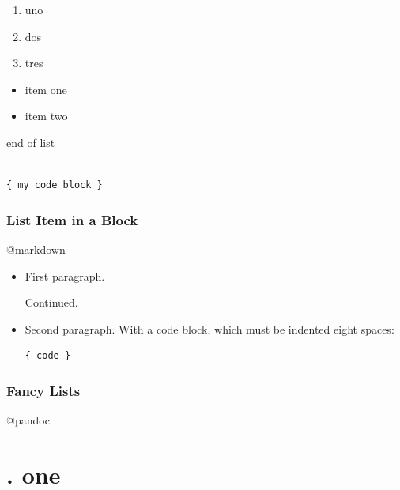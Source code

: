  

\begin{enumerate}
\item uno

\item dos

\item tres

\end{enumerate}

 

\begin{itemize}
\item item one

\item item two

\end{itemize}

 end of list 

\begin{adjustwidth}{2.5em}{2.5em}
\begin{verbatim}

{ my code block }

\end{verbatim}
\end{adjustwidth}

\subsection{List Item in a Block}
\label{listiteminablock}

@markdown

\begin{itemize}
\item First paragraph.

Continued.

\item Second paragraph. With a code block, which must be indented
eight spaces:

\begin{verbatim}
{ code }
\end{verbatim}

\end{itemize}

\subsection{Fancy Lists}
\label{fancylists}

@pandoc

\chapter{. one}
\label{.one}

